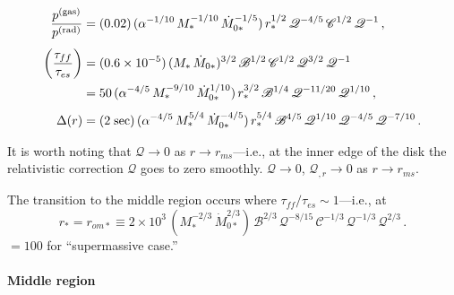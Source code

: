 
\begin{align}
\frac{p^{(\text{gas})}}{p^{(\text{rad})}}
&= (0.02)\,
    (\alpha^{-1/10}\,M_*^{-1/10}\,\dot{M}_{0*}^{-1/5})\,
    r_*^{1/2}\,
    \mathscr{Q}^{-4/5}\,\mathscr{C}^{1/2}\,\mathscr{Q}^{-1}\,, \notag \\[4pt]
%
\biggl(\frac{\tau_{ff}}{\tau_{es}}\biggr)
&= (0.6 \times 10^{-5})\,
    (M_*\,\dot{M}_{0*})^{3/2}\,
    \mathscr{B}^{1/2}\,\mathscr{C}^{1/2}\,\mathscr{Q}^{3/2}\,\mathscr{Q}^{-1} \notag \\
&= 50\,(\alpha^{-4/5}\,M_*^{-9/10}\,\dot{M}_{0*}^{1/10})\,
    r_*^{3/2}\,
    \mathscr{B}^{1/4}\,\mathscr{Q}^{-11/20}\,\mathscr{Q}^{1/10}\,, \notag \\[4pt]
%
\Delta(r) &= (2\;\text{sec})\,
    (\alpha^{-4/5}\,M_*^{5/4}\,\dot{M}_{0*}^{-4/5})\,
    r_*^{5/4}\,
    \mathscr{B}^{4/5}\,\mathscr{Q}^{1/10}\,\mathscr{Q}^{-4/5}\,\mathscr{Q}^{-7/10}\,. \notag
\end{align}

It is worth noting that $\mathscr{Q} \to 0$ as $r \to r_{ms}$---i.e., at
the inner edge of the disk the relativistic correction $\mathscr{Q}$ goes to zero smoothly.
$\mathscr{Q} \to 0$, $\mathscr{Q}_{,r} \to 0$ as $r \to r_{ms}$.

The transition to the middle region occurs where $\tau_{ff}/\tau_{es} \sim 1$---i.e., at
%
\begin{equation}
\tag{5.9.7}
r_* = r_{om*}
\equiv 2 \times 10^3\,
(M_*^{-2/3}\,\dot{M}_{0*}^{2/3})\,
\mathscr{B}^{2/3}\,\mathscr{Q}^{-8/15}\,\mathscr{C}^{-1/3}\,\mathscr{Q}^{-1/3}\,\mathscr{Q}^{2/3}\,.
\end{equation}
%
$= 100$ for ``supermassive case.''


\paragraph{Middle region}

